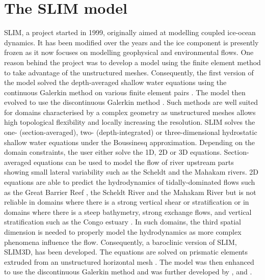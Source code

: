 \section{The SLIM model}
SLIM, a project started in 1999, originally aimed at modelling coupled ice-ocean dynamics. It has been modified over the years and the ice component is presently frozen as it now focuses on modelling geophysical and environmental flows. One reason behind the project was to develop a model using the finite element method to take advantage of the unstructured meshes. Consequently, the first version of the model solved the depth-averaged shallow water equations using the continuous Galerkin method on various finite element pairs \citep{hanert2003comparison,leroux2005some}. The model then evolved to use the discontinuous Galerkin method \citep{lambrechts2008multiscale}. Such methods are well suited for domains characterised by a complex geometry as unstructured meshes allows high topological flexibility and locally increasing the resolution. SLIM solves the one- (section-averaged), two- (depth-integrated) or three-dimensional hydrostatic shallow water equations under the Boussinesq approximation. Depending on the domain constraints, the user either solve the 1D, 2D or 3D equations. Section-averaged equations can be used to model the flow of river upstream parts showing small lateral variability such as the Scheldt \citep{gourgue2009flux,debrye2010finite, debrauwere2011residence,debrye2012water} and the Mahakam \citep{debrye2011preliminary,van2016simulations} rivers. 2D equations are able to predict the hydrodynamics of tidally-dominated flows such as the Great Barrier Reef \citep{lambrechts2008multi,thomas2014numerical, delandmeter2017submesoscale}, the Scheldt River and the Mahakam River but is not reliable in domains where there is a strong vertical shear or stratification \citep{delandmeter2015transport} or in domains where there is a steep bathymetry, strong exchange flows, and vertical stratification such as the Congo estuary \citep{lebars2016unstructured,vallaeys2018thesis,vallaeys2018columbia, vallaeys2020congo}. In such domains, the third spatial dimension is needed to properly model the hydrodynamics as more complex phenomena influence the flow. Consequently, a baroclinic version of SLIM, SLIM3D, has been developed. The equations are solved on prismatic elements extruded from an unstructured horizontal mesh \citep{white2008three,white2008tracer}. The model was then enhanced to use the discontinuous Galerkin method \citep{comblen2010discontinuous,blaise2010discontinuous} and was further developed by \citet{karna2013baroclinic}, \citet{delandmeter2018fully} and \citet{vallaeys2018thesis,vallaeys2018columbia, vallaeys2020congo}.


